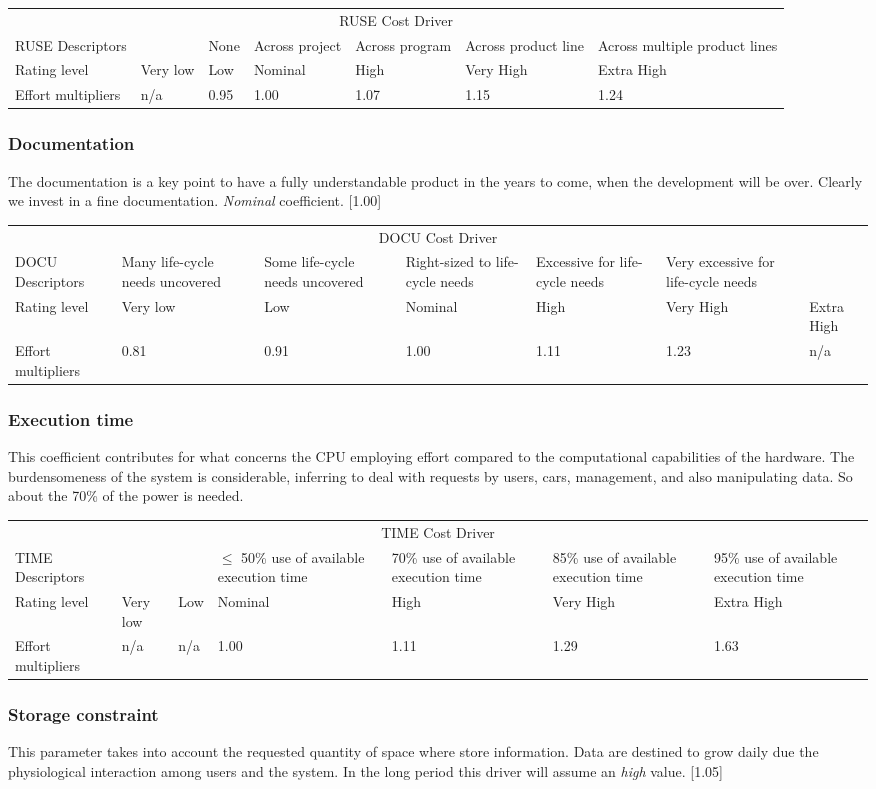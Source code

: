 \documentclass{scrreprt}
\newcommand{\costdescriptors}[7]{
	#1 & #2 & #3 & #4 & #5 & #6 & #7\\
}
\newcommand{\ratinglevel}[6]{
	Rating level & #1 & #2 & #3 & #4 & #5 & #6 \\\hline
}
\newcommand{\effortmultipliers}[6]{
	Effort multipliers & #1 & #2 & #3 & #4 & #5 & #6 \\\hline
}
\newenvironment{costdriverstable}[1]{
	\setlength{\LTleft}{-40pt}
	\begin{longtable}{|p{\dimexpr.16\textwidth}|p{\dimexpr.14\textwidth}|p{\dimexpr.14\textwidth}|p{\dimexpr.14\textwidth}|p{\dimexpr.14\textwidth}|p{\dimexpr.14\textwidth}|p{\dimexpr.14\textwidth}|}
	\hline
	\multicolumn{7}{|c|}{{#1}}\\\hhline{|=======|}
}{
	\hline\end{longtable}
}
\begin{document}
\begin{costdriverstable}{RUSE Cost Driver}
		\costdescriptors{RUSE Descriptors}{}{None}{Across project}{Across program}{Across product line}{Across multiple product lines}\hline
		\ratinglevel{Very low}{Low}{Nominal}{High}{Very High}{Extra High}
		\effortmultipliers{n/a}{0.95}{1.00}{\cellcolor[gray]{0.75}1.07}{1.15}{1.24}		
	\end{costdriverstable}
	
\subsubsection{Documentation}
The documentation is a key point to have a fully understandable product in the years to come, when the development will be over. Clearly we invest in a fine documentation. \emph{Nominal} coefficient. [1.00]
		\begin{costdriverstable}{DOCU Cost Driver}
		\costdescriptors{DOCU Descriptors}{Many life-cycle needs uncovered}{Some life-cycle needs uncovered}{Right-sized to life-cycle needs}{Excessive for life-cycle needs}{Very excessive for life-cycle needs}{}\hline
		\ratinglevel{Very low}{Low}{Nominal}{High}{Very High}{Extra High}
		\effortmultipliers{0.81}{0.91}{\cellcolor[gray]{0.75}1.00}{1.11}{1.23}{n/a}		
	\end{costdriverstable}
	
\subsubsection{Execution time}
This coefficient contributes for what concerns the CPU employing effort compared to the computational capabilities of the hardware.
The burdensomeness of the system is considerable, inferring to deal with requests by users, cars, management, and also manipulating data. So about the 70\% of the power is needed. 
	
		\begin{costdriverstable}{TIME Cost Driver}
		\costdescriptors{TIME Descriptors}{}{}{$\le$ 50\% use of available execution time}{70\% use of available execution time}{85\% use of available execution time} {95\% use of available execution time}\hline
		\ratinglevel{Very low}{Low}{Nominal}{High}{Very High}{Extra High}
		\effortmultipliers{n/a}{n/a}{1.00}{\cellcolor[gray]{0.75}1.11}{1.29}{1.63}	
	\end{costdriverstable}
	
\subsubsection{Storage constraint}
This parameter takes into account the requested quantity of space where store information.
Data are destined to grow daily due the physiological interaction among users and the system. 
In the long period this driver will assume an \emph{high} value. [1.05]
	
\end{document}
